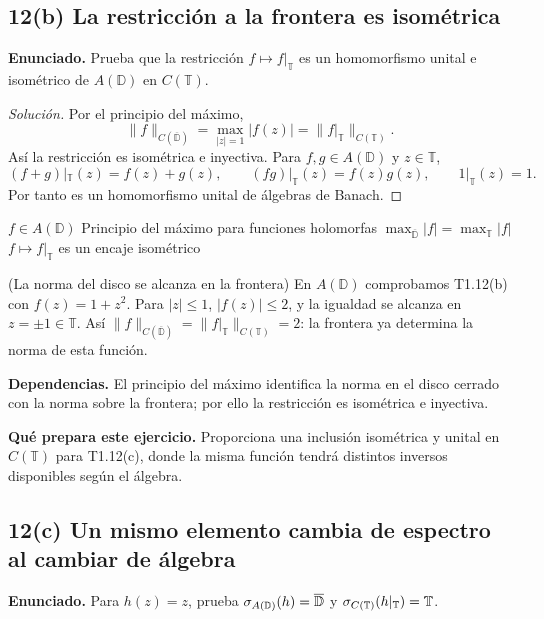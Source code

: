 \subsection*{12(b) La restricción a la frontera es isométrica}

\noindent\textbf{Enunciado.} Prueba que la restricción $f\mapsto f|_{\mathbb T}$ es un homomorfismo unital e isométrico de $A(\mathbb D)$ en $C(\mathbb T)$.

\begin{proof}[Solución]
Por el principio del máximo,
\[
 \|f\|_{C(\overline{\mathbb D})}=\max_{|z|=1}|f(z)|=\|f|_{\mathbb T}\|_{C(\mathbb T)}.
\]
Así la restricción es isométrica e inyectiva. Para $f,g\in A(\mathbb D)$ y $z\in\mathbb T$,
\[
 (f+g)|_{\mathbb T}(z)=f(z)+g(z),\qquad
 (fg)|_{\mathbb T}(z)=f(z)g(z),\qquad
 1|_{\mathbb T}(z)=1.
\]
Por tanto es un homomorfismo unital de álgebras de Banach.
\end{proof}

\proofdiagram
{$f\in A(\mathbb D)$}
{Principio del máximo para funciones holomorfas}
{$\max_{\overline{\mathbb D}}|f|=\max_{\mathbb T}|f|$}
{$f\mapsto f|_{\mathbb T}$ es un encaje isométrico}

\begin{cthejemplo}{(La norma del disco se alcanza en la frontera)}
En $A(\mathbb D)$ comprobamos T1.12(b) con $f(z)=1+z^2$.
Para $|z|\le1$, $|f(z)|\le2$, y la igualdad se alcanza en $z=\pm1\in\mathbb T$.
Así $\|f\|_{C(\overline{\mathbb D})}=\|f|_{\mathbb T}\|_{C(\mathbb T)}=2$:
la frontera ya determina la norma de esta función.
\end{cthejemplo}

\noindent\textbf{Dependencias.} El principio del máximo identifica la norma en el disco cerrado con la norma sobre la frontera; por ello la restricción es isométrica e inyectiva.

\noindent\textbf{Qué prepara este ejercicio.} Proporciona una inclusión isométrica y unital en $C(\mathbb T)$ para T1.12(c), donde la misma función tendrá distintos inversos disponibles según el álgebra.

\subsection*{12(c) Un mismo elemento cambia de espectro al cambiar de álgebra}

\noindent\textbf{Enunciado.} Para $h(z)=z$, prueba $\sigma_{A(\mathbb D)}(h)=\overline{\mathbb D}$ y $\sigma_{C(\mathbb T)}(h|_{\mathbb T})=\mathbb T$.

